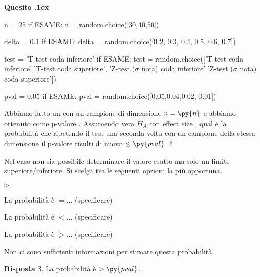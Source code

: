 \documentclass[11pt,twoside,a4paper]{article}
\newcommand{\mylabel}[1]{#1\hfill}
\renewenvironment{itemize}
  {\begin{list}{$\triangleright$}{%
   \setlength{\parskip}{0mm}
   \setlength{\topsep}{.4\baselineskip}
   \setlength{\rightmargin}{0mm}
   \setlength{\listparindent}{0mm}
   \setlength{\itemindent}{0mm}
   \setlength{\labelwidth}{2ex}
   \setlength{\itemsep}{.4\baselineskip}
   \setlength{\parsep}{0mm}
   \setlength{\partopsep}{0mm}
   \setlength{\labelsep}{1ex}
   \setlength{\leftmargin}{\labelwidth+\labelsep}
   \let\makelabel\mylabel}}{%
   \end{list}\vspace*{-1.3mm}}
\newcounter{quesito}
\newenvironment{question}{\bigskip\addtocounter{quesito}{1}\par\textbf{Quesito \thequesito.\kern1ex}}{\vspace{\parskip}}
\newenvironment{answer}{\par\textbf{Risposta\quad}}{\vspace{\parskip}}
\begin{document}
\clearpage
\begin{question} %
\begin{pycode}
n = 25
if ESAME: n = random.choice([30,40,50])

delta = 0.1
if ESAME: delta = random.choice([0.2, 0.3, 0.4, 0.5, 0.6, 0.7])

test = 'T-test coda inferiore'
if ESAME: test = random.choice(['T-test coda inferiore','T-test coda superiore', 'Z-test ($\sigma$ nota) coda inferiore' 'Z-test ($\sigma$ nota) coda superiore'])

pval = 0.05
if ESAME: pval = random.choice([0.05,0.04,0.02, 0.01])
\end{pycode}
Abbiamo fatto un  con un campione di dimensione $n=\py{n}$ e abbiamo ottenuto come p-valore .
Assumendo vera $H_A$ con effect size , qual è la probabilità che ripetendo il test una seconda volta con un campione della stessa dimensione il p-valore risulti di nuovo $\le\py{pval}$~?

Nel caso non sia possibile determinare il valore esatto ma solo un limite superiore/inferiore. Si scelga tra le seguenti opzioni la più opportuna.
\begin{itemize}
\item[1.] La probabilità è $=\dots$ (specificare)
\item[2.] La probabilità è $<\dots$ (specificare)
\item[3.] La probabilità è $>\dots$ (specificare)
\item[4.] Non ci sono sufficienti informazioni per stimare questa probabilità.
\end{itemize}
\begin{answer}
{\color{blue}3. La probabilità è $>\py{pval}$.}
\end{answer}
\end{question}
\end{document}
